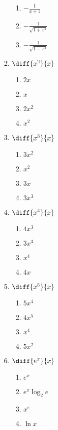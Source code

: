 \documentclass[10pt,twocolumn]{article}
\begin{document}
\begin{enumerate}
	\begin{enumerate}
		\item \(-\frac{1}{x+1}\)
		\item \(-\frac{1}{\sqrt{1+x^2}}\)
		\item \(-\frac{1}{\sqrt{1-x^2}}\)
	\end{enumerate}


		\item \(\diff{x^2}{x}\)
	\begin{enumerate}
		\item \(2x\)
		\item \(x\)
		\item \(2x^2\)
		\item \(x^2\)
	\end{enumerate}


		\item \(\diff{x^3}{x}\)
	\begin{enumerate}
		\item \(3x^2\)
		\item \(x^2\)
		\item \(3x\)
		\item \(3x^3\)
	\end{enumerate}


		\item \(\diff{x^4}{x}\)
	\begin{enumerate}
		\item \(4x^3\)
		\item \(3x^3\)
		\item \(x^4\)
		\item \(4x\)
	\end{enumerate}


		\item \(\diff{x^5}{x}\)
	\begin{enumerate}
		\item \(5x^4\)
		\item \(4x^5\)
		\item \(x^4\)
		\item \(5x^2\)
	\end{enumerate}


		\item \(\diff{e^x}{x}\)
	\begin{enumerate}
		\item \(e^x\)
		\item \(e^x \log_2{e}\)
		\item \(x^e\)
		\item \(\ln{x}\)
	\end{enumerate}



\end{enumerate}
\end{document}
